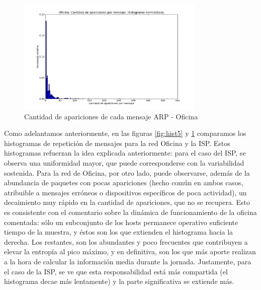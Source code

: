 \begin{figure}[H]
	\centering
	\includegraphics[width=0.8\textwidth]{graficos/hist_oficina.png}
	\caption{Cantidad de apariciones de cada mensaje ARP - Oficina}
	\label{fig:hist6}
\end{figure}

Como adelantamos anteriormente, en las figuras \ref{fig:hist5} y \ref{fig:hist6} comparamos los histogramas de repetición de mensajes para la red Oficina y la ISP.  Estos histogramas refuerzan la idea explicada anteriormente: para el caso del ISP, se observa una uniformidad mayor, que puede corresponderse con la variabilidad sostenida. Para la red de Oficina, por otro lado, puede observarse, además de la abundancia de paquetes con pocas apariciones (hecho común en ambos casos, atribuible a mensajes erróneos o dispositivos específicos de poca actividad), un decaimiento muy rápido en la cantidad de apariciones, que no se recupera. Esto es consistente con el comentario sobre la dinámica de funcionamiento de la oficina comentada: sólo un subconjunto de los hosts permanece operativo suficiente tiempo de la muestra, y éstos son los que extienden el histograma hacia la derecha. Los restantes, son los abundantes y poco frecuentes que contribuyen a elevar la entropía al pico máximo, y en definitiva, son los que más aporte 
realizan a la hora de calcular la información media durante la jornada. Justamente, para el caso de la ISP, se ve que esta responsabilidad está más compartida (el histograma decae más lentamente) y la parte significativa se extiende más.

